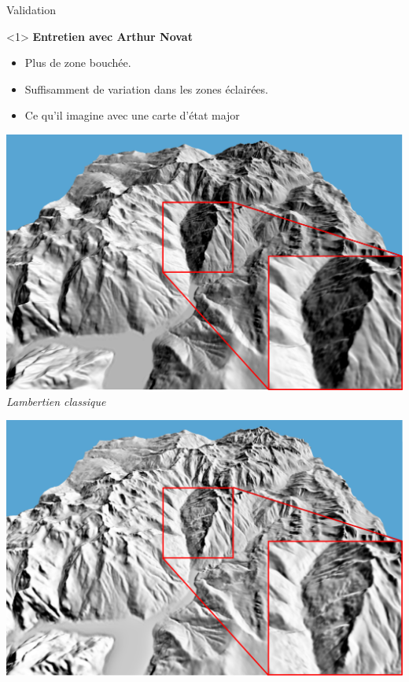 \documentclass{beamer}
\begin{document}
\begin{frame}[noframenumbering]{Validation}
\begin{onlyenv}<1>
\textbf{Entretien avec Arthur Novat}
\begin{itemize}
\item Plus de zone bouchée.
\item Suffisamment de variation dans les zones éclairées.
\item Ce qu'il imagine avec une carte d'état major
\end{itemize}
\begin{center}
	\begin{minipage}[t]{0.32\linewidth}
    \begin{center}
    	\includegraphics[width=1.0\linewidth]{Resultats/lambertien.png}\\
 		\textit{Lambertien classique}
    \end{center}
    \end{minipage}
    \begin{minipage}[t]{0.32\linewidth}
    \begin{center}
    	\includegraphics[width=1.0\linewidth]{Resultats/ombrage.png}\\

\end{center}
\end{minipage}
\end{center}
\end{onlyenv}
\end{frame}
\end{document}
